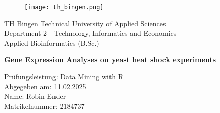 \begin{titlepage}

	\begin{figure}
	\texttt{[image: th\_bingen.png]}
	\end{figure}
	
	\begin{center}
	\large
	TH Bingen Technical University of Applied Sciences\\
    Department 2 - Technology, Informatics and Economics\\
    Applied Bioinformatics (B.Sc.)\\
    \vspace{0.5cm}
	
    \huge
    \textbf{Gene Expression Analyses on yeast heat
shock experiments} 
    \vfill
    
    \large
    Prüfungsleistung: Data Mining with R \\
    Abgegeben am: 11.02.2025 \\
    Name: Robin Ender \\
    Matrikelnummer: 2184737
    \vspace{0.5cm}
	\end{center}
	
\end{titlepage}

